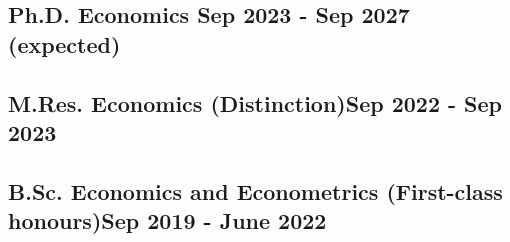 \vspace*{10pt}
\subsection{{Ph.D. Economics} \hfill Sep 2023 - Sep 2027 (expected)}
\vspace*{12pt}

\subsection {{M.Res. Economics} (Distinction)\hfill Sep 2022 - Sep 2023}
\vspace*{12pt}

\subsection{{B.Sc. Economics and Econometrics (First-class honours)}\hfill Sep 2019 - June 2022}
\vspace*{5pt}
